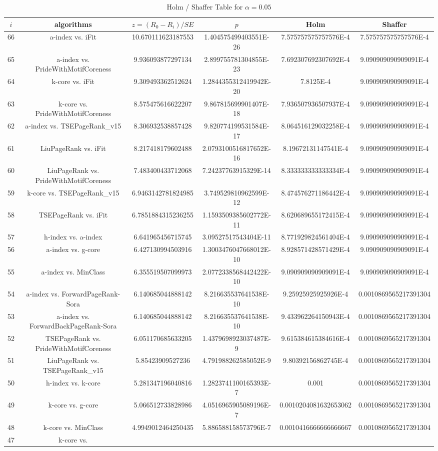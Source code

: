 \documentclass[a4paper,10pt]{article}
\begin{document}
\begin{landscape}
\begin{table}[!htp]
\centering\tiny
\caption{Holm / Shaffer Table for $\alpha=0.05$}
\begin{tabular}{cccccc}
$i$&algorithms&$z=(R_0 - R_i)/SE$&$p$&Holm&Shaffer\\
\hline
66&a-index vs. iFit&10.670111623187553&1.404575499403551E-26&7.575757575757576E-4&7.575757575757576E-4\\65&a-index vs. PrideWithMotifCoreness&9.936093877297134&2.899755781304855E-23&7.692307692307692E-4&9.090909090909091E-4\\64&k-core vs. iFit&9.309493362512624&1.2844355312419942E-20&7.8125E-4&9.090909090909091E-4\\63&k-core vs. PrideWithMotifCoreness&8.575475616622207&9.867815699901407E-18&7.936507936507937E-4&9.090909090909091E-4\\62&a-index vs. TSEPageRank_v15&8.306932538857428&9.820774199531584E-17&8.064516129032258E-4&9.090909090909091E-4\\61&LiuPageRank vs. iFit&8.217418179602488&2.0793100516817652E-16&8.19672131147541E-4&9.090909090909091E-4\\60&LiuPageRank vs. PrideWithMotifCoreness&7.483400433712068&7.24237763915329E-14&8.333333333333334E-4&9.090909090909091E-4\\59&k-core vs. TSEPageRank_v15&6.9463142781824985&3.749529810962599E-12&8.474576271186442E-4&9.090909090909091E-4\\58&TSEPageRank vs. iFit&6.7851884315236255&1.1593509385602772E-11&8.620689655172415E-4&9.090909090909091E-4\\57&h-index vs. a-index&6.641965456715745&3.09527517543404E-11&8.771929824561404E-4&9.090909090909091E-4\\56&a-index vs. g-core&6.427130994503916&1.3003476047668012E-10&8.928571428571429E-4&9.090909090909091E-4\\55&a-index vs. MinClass&6.355519507099973&2.0772338568442422E-10&9.090909090909091E-4&9.090909090909091E-4\\54&a-index vs. ForwardPageRank-Sora&6.140685044888142&8.216635537641538E-10&9.25925925925926E-4&0.0010869565217391304\\53&a-index vs. ForwardBackPageRank-Sora&6.140685044888142&8.216635537641538E-10&9.433962264150943E-4&0.0010869565217391304\\52&TSEPageRank vs. PrideWithMotifCoreness&6.051170685633205&1.4379698923037487E-9&9.615384615384616E-4&0.0010869565217391304\\51&LiuPageRank vs. TSEPageRank_v15&5.85423909527236&4.791988262585052E-9&9.80392156862745E-4&0.0010869565217391304\\50&h-index vs. k-core&5.281347196040816&1.2823741100165393E-7&0.001&0.0010869565217391304\\49&k-core vs. g-core&5.066512733828986&4.0516965905089196E-7&0.0010204081632653062&0.0010869565217391304\\48&k-core vs. MinClass&4.9949012464250435&5.886588158573796E-7&0.0010416666666666667&0.0010869565217391304\\47&k-core vs. 
\end{tabular}
\end{table}
\end{landscape}
\end{document}

